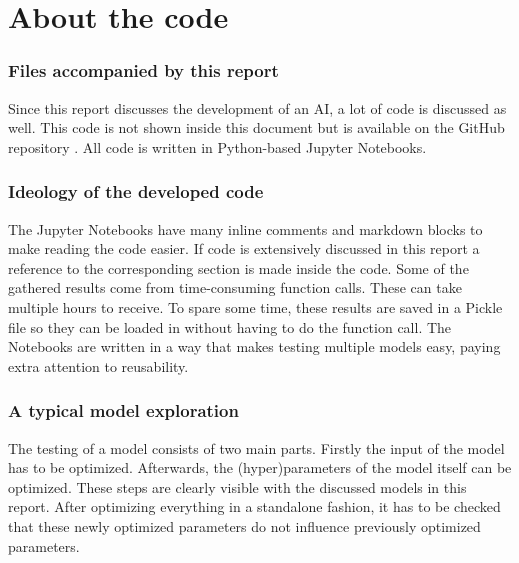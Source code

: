 \part{About the code}
\label{part:about_the_code}


\section{Files accompanied by this report}
\label{section:inc_files}
Since this report discusses the development of an AI, a lot of code is discussed as well.
This code is not shown inside this document but is available on the GitHub repository \citep{github_project}.
All code is written in Python-based Jupyter Notebooks.



\section{Ideology of the developed code}
\label{section:ideology_dev_code}
The Jupyter Notebooks have many inline comments and markdown blocks to make reading the code easier.
If code is extensively discussed in this report a reference to the corresponding section is made inside the code. 
Some of the gathered results come from time-consuming function calls.
These can take multiple hours to receive.
To spare some time, these results are saved in a Pickle file so they can be loaded in without having to do the function call.
The Notebooks are written in a way that makes testing multiple models easy, paying extra attention to reusability. 


\section{A typical model exploration}
\label{section:typical_model_exploration}
The testing of a model consists of two main parts.
Firstly the input of the model has to be optimized.
Afterwards, the (hyper)parameters of the model itself can be optimized.
These steps are clearly visible with the discussed models in this report.
After optimizing everything in a standalone fashion, it has to be checked that these newly optimized parameters do not influence previously optimized parameters.



